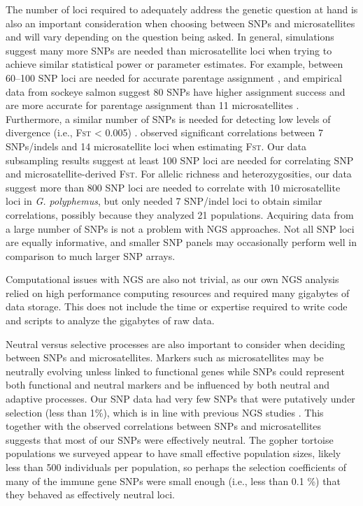 \documentclass[english]{article}\usepackage[]{graphicx}\usepackage[]{color}
\begin{document}
The number of loci required to adequately address the genetic question at hand is also an important consideration when choosing between SNPs and microsatellites and will vary depending on the question being asked. In general, simulations suggest many more SNPs are needed than microsatellite loci when trying to achieve similar statistical power or parameter estimates. For example, between 60--100 SNP loci are needed for accurate parentage assignment \citep{Anderson_and_Garza_2006}, and empirical data from sockeye salmon suggest 80 SNPs have higher assignment success and are more accurate for parentage assignment than 11 microsatellites \citep{Hauser_et_al_2011}. Furthermore, a similar number of SNPs is needed for detecting low levels of divergence (i.e., \textsc{Fst} < 0.005) \citep{Morin_et_al_2009}. \citet{Ryynanen_et_al_2007} observed significant correlations between 7 SNPs/indels and 14 microsatellite loci when estimating \textsc{Fst}. Our data subsampling results suggest at least 100 SNP loci are needed for correlating SNP and microsatellite-derived \textsc{Fst}. For allelic richness and heterozygosities, our data suggest more than 800 SNP loci are needed to correlate with 10 microsatellite loci in \textit{G. polyphemus}, but \citet{Ryynanen_et_al_2007} only needed 7 SNP/indel loci to obtain similar correlations, possibly because they analyzed 21 populations. Acquiring data from a large number of SNPs is not a problem with NGS approaches. Not all SNP loci are equally informative, and smaller SNP panels may occasionally perform well in comparison to much larger SNP arrays.

Computational issues with NGS are also not trivial, as our own NGS analysis relied on high performance computing resources and required many gigabytes of data storage. This does not include the time or expertise required to write code and scripts to analyze the gigabytes of raw data.

Neutral versus selective processes are also important to consider when deciding between SNPs and microsatellites. Markers such as microsatellites may be neutrally evolving unless linked to functional genes while SNPs could represent both functional and neutral markers and be influenced by both neutral and adaptive processes. Our SNP data had very few SNPs that were putatively under selection (less than 1\%), which is in line with previous NGS studies \citep[e.g.,][]{Hohenlohe_et_al_2010, Lemay_and_Russello_2015, Blanco-Bercial_and_Bucklin_2016}. This together with the observed correlations between SNPs and microsatellites suggests that most of our SNPs were effectively neutral. The gopher tortoise populations we surveyed appear to have small effective population sizes, likely less than 500 individuals per population, so perhaps the selection coefficients of many of the immune gene SNPs were small enough (i.e., less than 0.1 \%) that they behaved as effectively neutral loci.
\end{document}
